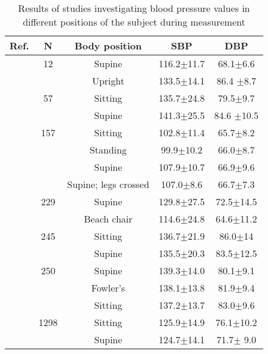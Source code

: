 \documentclass[journal,article,moreauthors]{Definitions/mdpi}
\begin{document}
\begin{table}[tb]
\caption{Results of studies investigating blood pressure values in different positions of the subject during measurement}\label{Tab: bodyposition}
\begin{center}
\begin{tabular}{rcccc}
\toprule
\textbf{Ref.} & \textbf{N} &\textbf{Body position} & \textbf{SBP} & \textbf{DBP} \\
\hline
\citep{McMullen2011-qu} & 12  & Supine & 116.2$\pm$11.7 &  68.1$\pm$6.6 \\                                      & & Upright & 133.5$\pm$14.1 & 86.4 $\pm$8.7
\\\hline
\citep{Netea2003} & 57 & Sitting & 135.7$\pm$24.8 &  79.5$\pm$9.7 \\                                      & & Supine & 141.3$\pm$25.5 & 84.6 $\pm$10.5
\\\hline
\citep{ecser2007effect} & 157 & Sitting & 102.8$\pm$11.4 &  65.7$\pm$8.2 \\                                      & & Standing & 99.9$\pm$10.2 & 66.0$\pm$8.7\\                                      & & Supine & 107.9$\pm$10.7 & 66.9$\pm$9.6\\                                      & & Supine; legs crossed & 107.0$\pm$8.6 & 66.7$\pm$7.3
\\\hline
\citep{Chachula2020-nl} & 229 &Supine & 129.8$\pm$27.5 & 72.5$\pm$14.5 \\ 

& &Beach chair & 114.6$\pm$24.8 &  64.6$\pm$11.2  
\\\hline
\citep{netea1998does} & 245 & Sitting & 136.7$\pm$21.9 &
86.0$\pm$14
\\ & & Supine &135.5$\pm$20.3  &83.5$\pm$12.5 
\\\hline
\citep{cicolini2011differences} & 250 & Supine & 139.3$\pm$14.0 & 80.1$\pm$9.1 \\ 
& &Fowler’s & 138.1$\pm$13.8 & 81.9$\pm$9.4\\ 
& & Sitting & 137.2$\pm$13.7 & 83.0$\pm$9.6\\\hline
\citep{privvsek2018epidemiological} & 1298 & Sitting & 125.9$\pm$14.9 & 76.1$\pm$10.2
\\ & & Supine &  124.7$\pm$14.1 & 71.7$\pm$ 9.0
\\
\bottomrule
\end{tabular}
\end{center}
\end{table}
\end{document}
